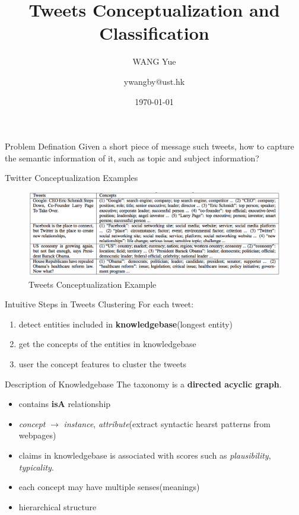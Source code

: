 \documentclass[11pt, a4paper]{beamer}
\title{Tweets Conceptualization and Classification}
\author{WANG Yue\and{ywangby@ust.hk}}
\institute[HKUST]{
    Department of Computer Science \\
    Hong Kong University of Science and Technology \\
}
\date{\today}
\begin{document}
\begin{frame}[plain]
    \titlepage
\end{frame}

\begin{frame}{Problem Defination}
Given a short piece of message such tweets, how to capture the semantic information of it, such as topic and subject information?
\end{frame}

\begin{frame}{Twitter Conceptualization Examples}
\begin{center}
    \begin{figure}
        \includegraphics[width=1.0\textwidth]{./figure/tweets_concep_example.png}
        \caption{Tweets Conceptualization Example}
    \end{figure}
\end{center}
\end{frame}

\begin{frame}{Intuitive Steps in Tweets Clustering}
For each tweet:
\begin{enumerate}
    \item detect entities included in \textbf{knowledgebase}(longest entity)
    \item get the concepts of the entities in knowledgebase
    \item user the concept features to cluster the tweets
\end{enumerate}
\end{frame}

\begin{frame}{Description of Knowledgebase}
The taxonomy is a \textbf{directed acyclic graph}.
\begin{itemize}
    \item contains \textbf{isA} relationship
    \item \emph{concept} $\rightarrow$ \emph{instance}, \emph{attribute}(extract syntactic hearst patterns from webpages)
    \item claims in knowledgebase is associated with scores such as \emph{plausibility}, \emph{typicality}.
    \item each concept may have multiple senses(meanings)
    \item hierarchical structure
\end{itemize}
\end{frame}
\end{document}
